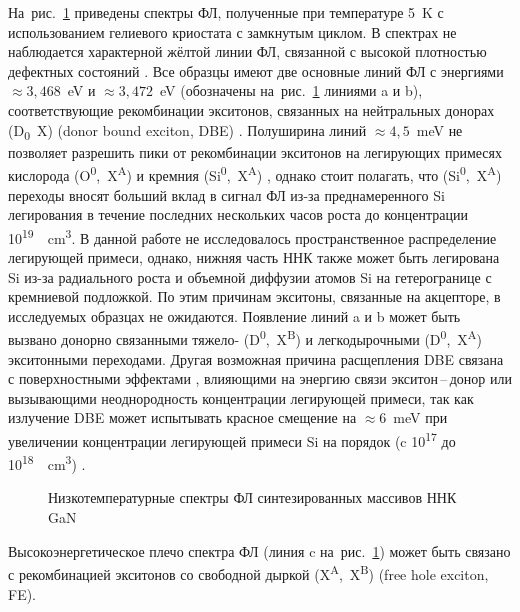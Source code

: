 На~рис.~\cref{fig:Image_30_1} приведены спектры ФЛ, полученные при температуре 5~\si{\kelvin} с использованием гелиевого криостата с замкнутым циклом. В спектрах не наблюдается характерной жёлтой линии ФЛ, связанной с высокой плотностью дефектных состояний \cite{Suski1995}. Все образцы имеют две основные линий ФЛ с энергиями \(\approx 3,468\)~\si{\electronvolt} и \(\approx 3,472\)~\si{\electronvolt} (обозначены на~рис.~\cref{fig:Image_30_1} линиями a и b), соответствующие рекомбинации экситонов, связанных на нейтральных донорах (D\textsubscript{0}~X) (donor bound exciton, DBE) \cite{Bolshakov2018, Paskov2004}. Полуширина линий \(\approx 4,5\)~\si{\milli\electronvolt} не позволяет разрешить пики от рекомбинации экситонов на легирующих примесях кислорода (O\textsuperscript{0},~X\textsuperscript{A}) и кремния (Si\textsuperscript{0},~X\textsuperscript{A}) \cite{Zettler2015}, однако стоит полагать, что (Si\textsuperscript{0},~X\textsuperscript{A}) переходы вносят больший вклад в сигнал ФЛ из-за преднамеренного Si легирования в течение последних нескольких часов роста до концентрации 10\textsuperscript{19}~\si{\per\centi\metre\cubed}. В данной работе не исследовалось пространственное распределение легирующей примеси, однако, нижняя часть ННК также может быть легирована Si из-за радиального роста и объемной диффузии атомов Si на гетерогранице с кремниевой подложкой. По этим причинам экситоны, связанные на акцепторе, в исследуемых образцах не ожидаются. Появление линий a и b может быть вызвано донорно связанными тяжело- (D\textsuperscript{0},~X\textsuperscript{B}) и легкодырочными (D\textsuperscript{0},~X\textsuperscript{A}) экситонными переходами. Другая возможная причина расщепления DBE связана с поверхностными эффектами \cite{Calarco2011}, влияющими на энергию связи экситон\,--\,донор или вызывающими неоднородность концентрации легирующей примеси, так как излучение DBE может испытывать красное смещение на \(\approx 6\)~\si{\milli\electronvolt} при увеличении концентрации легирующей примеси Si на порядок (c 10\textsuperscript{17} до 10\textsuperscript{18}~\si{\per\centi\metre\cubed}) \cite{Pozina2011}.

\begin{figure}[ht]
	\caption{Низкотемпературные спектры ФЛ синтезированных массивов ННК GaN}\label{fig:Image_30_1}
\end{figure}

Высокоэнергетическое плечо спектра ФЛ (линия c на~рис.~\cref{fig:Image_30_1}) может быть связано с рекомбинацией экситонов со свободной дыркой (X\textsuperscript{A},~X\textsuperscript{B}) (free hole exciton, FE).

